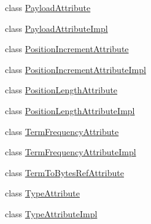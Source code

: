 \begin{DoxyCompactItemize}
class \mbox{\hyperlink{classlucene_1_1core_1_1analysis_1_1tokenattributes_1_1PayloadAttribute}{Payload\+Attribute}}
\item 
class \mbox{\hyperlink{classlucene_1_1core_1_1analysis_1_1tokenattributes_1_1PayloadAttributeImpl}{Payload\+Attribute\+Impl}}
\item 
class \mbox{\hyperlink{classlucene_1_1core_1_1analysis_1_1tokenattributes_1_1PositionIncrementAttribute}{Position\+Increment\+Attribute}}
\item 
class \mbox{\hyperlink{classlucene_1_1core_1_1analysis_1_1tokenattributes_1_1PositionIncrementAttributeImpl}{Position\+Increment\+Attribute\+Impl}}
\item 
class \mbox{\hyperlink{classlucene_1_1core_1_1analysis_1_1tokenattributes_1_1PositionLengthAttribute}{Position\+Length\+Attribute}}
\item 
class \mbox{\hyperlink{classlucene_1_1core_1_1analysis_1_1tokenattributes_1_1PositionLengthAttributeImpl}{Position\+Length\+Attribute\+Impl}}
\item 
class \mbox{\hyperlink{classlucene_1_1core_1_1analysis_1_1tokenattributes_1_1TermFrequencyAttribute}{Term\+Frequency\+Attribute}}
\item 
class \mbox{\hyperlink{classlucene_1_1core_1_1analysis_1_1tokenattributes_1_1TermFrequencyAttributeImpl}{Term\+Frequency\+Attribute\+Impl}}
\item 
class \mbox{\hyperlink{classlucene_1_1core_1_1analysis_1_1tokenattributes_1_1TermToBytesRefAttribute}{Term\+To\+Bytes\+Ref\+Attribute}}
\item 
class \mbox{\hyperlink{classlucene_1_1core_1_1analysis_1_1tokenattributes_1_1TypeAttribute}{Type\+Attribute}}
\item 
class \mbox{\hyperlink{classlucene_1_1core_1_1analysis_1_1tokenattributes_1_1TypeAttributeImpl}{Type\+Attribute\+Impl}}
\end{DoxyCompactItemize}

